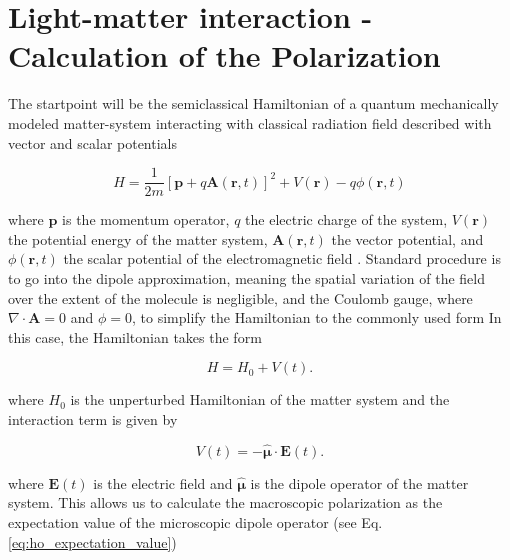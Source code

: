 \section{Light-matter interaction - Calculation of the Polarization}
\label{sec:light_matter_interaction}

\noindent
The startpoint will be the semiclassical Hamiltonian of a quantum mechanically modeled matter-system interacting with classical radiation field described with vector and scalar potentials

\begin{equation}
	H = \frac{1}{2m} [\mathbf{p} + q \mathbf{A}(\mathbf{r}, t)]^2 + V(\mathbf{r}) - q \phi(\mathbf{r}, t)
	\label{eq:hamiltonian}
\end{equation}

\noindent
where $\mathbf{p}$ is the momentum operator, $q$ the electric charge of the system, $V(\mathbf{r})$ the potential energy of the matter system, $\mathbf{A}(\mathbf{r}, t)$ the vector potential, and $\phi(\mathbf{r}, t)$ the scalar potential of the electromagnetic field \cite{cohen-tannoudjietal2008atomphotoninteractionsbasic}. Standard procedure is to go into the dipole approximation, meaning the spatial variation of the field over the extent of the molecule is negligible, and the Coulomb gauge, where $\nabla \cdot \mathbf{A} = 0$ and $\phi = 0$, to simplify the Hamiltonian to the commonly used form 
In this case, the Hamiltonian takes the form

\begin{equation}
	H = H_0 + V(t).
\end{equation}

\noindent 
where $H_0$ is the unperturbed Hamiltonian of the matter system and the interaction term is given by

\begin{equation} \label{eq:dipole_approx_term}
	V(t) = - \mathbf{\hat{\mu}} \cdot \mathbf{E}(t).
\end{equation}

\noindent
where $\mathbf{E}(t)$ is the electric field and $\mathbf{\hat{\mu}}$ is the dipole operator of the matter system. 
This allows us to calculate the macroscopic polarization as the expectation value of the microscopic dipole operator (see Eq. \eqref{eq:ho_expectation_value})

